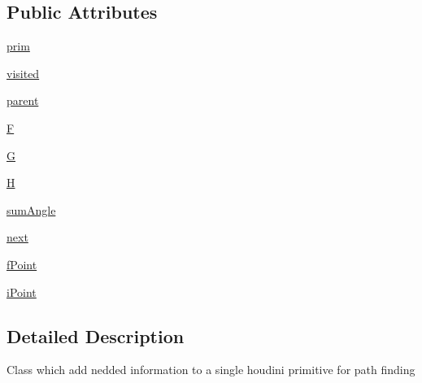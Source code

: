 \subsection*{Public Attributes}
\begin{DoxyCompactItemize}
\item 
\hyperlink{classdestruction_1_1_info_path_prim_1_1_info_path_prim_ad8c567d2a98be7e9e69c82b1b187726e}{prim}
\item 
\hyperlink{classdestruction_1_1_info_path_prim_1_1_info_path_prim_a431092463653864d77e101e764b8dafb}{visited}
\item 
\hyperlink{classdestruction_1_1_info_path_prim_1_1_info_path_prim_a125fd10be8fbddfc286632ac90a5f85e}{parent}
\item 
\hyperlink{classdestruction_1_1_info_path_prim_1_1_info_path_prim_a1ef8d3b9bac3350a12ab46b0a3bf24a2}{F}
\item 
\hyperlink{classdestruction_1_1_info_path_prim_1_1_info_path_prim_a94c93837a60518a56d1d0f97251e10cc}{G}
\item 
\hyperlink{classdestruction_1_1_info_path_prim_1_1_info_path_prim_a3728ea81e644077576cb330286c4d24a}{H}
\item 
\hyperlink{classdestruction_1_1_info_path_prim_1_1_info_path_prim_a0e9e3682a55d359a3ebe78ab399a7c21}{sum\-Angle}
\item 
\hyperlink{classdestruction_1_1_info_path_prim_1_1_info_path_prim_a42951ed6b2e4417746b8de4384d06ac8}{next}
\item 
\hyperlink{classdestruction_1_1_info_path_prim_1_1_info_path_prim_adcff0ad641a505e7cab225d4870addce}{f\-Point}
\item 
\hyperlink{classdestruction_1_1_info_path_prim_1_1_info_path_prim_a6fa21c2f154b41dbe3e4f265fac7da78}{i\-Point}
\end{DoxyCompactItemize}


\subsection{Detailed Description}
\begin{DoxyVerb}Class which add nedded information to a single houdini primitive for path finding
\end{DoxyVerb}
 

